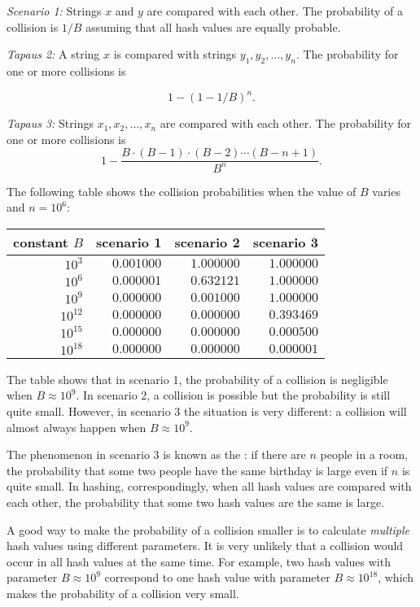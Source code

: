 \textit{Scenario 1:} Strings $x$ and $y$ are compared with
each other.
The probability of a collision is $1/B$ assuming that
all hash values are equally probable.

\textit{Tapaus 2:} A string $x$ is compared with strings
$y_1,y_2,\ldots,y_n$.
The probability for one or more collisions is

\[1-(1-1/B)^n.\]

\textit{Tapaus 3:} Strings $x_1,x_2,\ldots,x_n$
are compared with each other.
The probability for one or more collisions is
\[ 1 - \frac{B \cdot (B-1) \cdot (B-2) \cdots (B-n+1)}{B^n}.\]

The following table shows the collision probabilities
when the value of $B$ varies and $n=10^6$:

\begin{center}
\begin{tabular}{rrrr}
constant $B$ & scenario 1 & scenario 2 & scenario 3 \\
\hline
$10^3$ & $0.001000$ & $1.000000$ & $1.000000$ \\
$10^6$ & $0.000001$ & $0.632121$ & $1.000000$ \\
$10^9$ & $0.000000$ & $0.001000$ & $1.000000$ \\
$10^{12}$ & $0.000000$ & $0.000000$ & $0.393469$ \\
$10^{15}$ & $0.000000$ & $0.000000$ & $0.000500$ \\
$10^{18}$ & $0.000000$ & $0.000000$ & $0.000001$ \\
\end{tabular}
\end{center}

The table shows that in scenario 1,
the probability of a collision is negligible
when $B \approx 10^9$.
In scenario 2, a collision is possible but the
probability is still quite small.
However, in scenario 3 the situation is very different:
a collision will almost always happen when
$B \approx 10^9$.


The phenomenon in scenario 3 is known as the
: if there are $n$ people
in a room, the probability that some two people
have the same birthday is large even if $n$ is quite small.
In hashing, correspondingly, when all hash values are compared
with each other, the probability that some two
hash values are the same is large.

A good way to make the probability of a collision
smaller is to calculate \emph{multiple} hash values
using different parameters.
It is very unlikely that a collision would occur
in all hash values at the same time.
For example, two hash values with parameter
$B \approx 10^9$ correspond to one hash
value with parameter $B \approx 10^{18}$,
which makes the probability of a collision very small.

